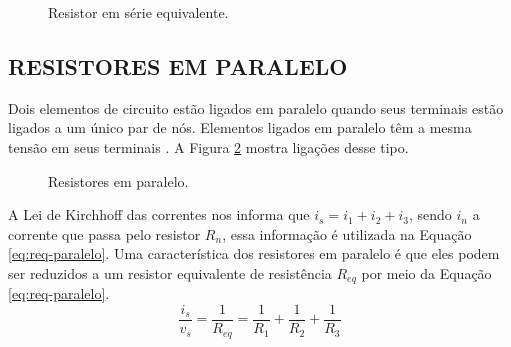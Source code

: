\documentclass[12pt]{article}
\begin{document}
    \begin{figure}[H]
        \centering
        \caption{Resistor em série equivalente.}
        \label{fig:r-serie-equivalente}
    \end{figure}

    \subsection{RESISTORES EM PARALELO}
    Dois elementos de circuito estão ligados em paralelo quando seus terminais estão ligados a um único par de nós. Elementos ligados em paralelo têm a mesma tensão em seus terminais \parencite[][, p. 62]{nilsson}. A Figura \ref{fig:r-paralelo} mostra ligações desse tipo.
    \begin{figure}[H]
        \centering
        \caption{Resistores em paralelo.}
        \label{fig:r-paralelo}
    \end{figure}

    A Lei de Kirchhoff das correntes nos informa que $i_s=i_1+i_2+i_3$, sendo $i_n$ a corrente que passa pelo resistor $R_n$, essa informação é utilizada na Equação \ref{eq:req-paralelo}.
    Uma característica dos resistores em paralelo é que eles podem ser reduzidos a um resistor equivalente de resistência $R_{eq}$ por meio da Equação \ref{eq:req-paralelo}.
    \begin{equation}
        \label{eq:req-paralelo}
        \frac{i_s}{v_s}=\frac{1}{R_{eq}}=\frac{1}{R_1}+\frac{1}{R_2}+\frac{1}{R_3}
    \end{equation}
\end{document}
